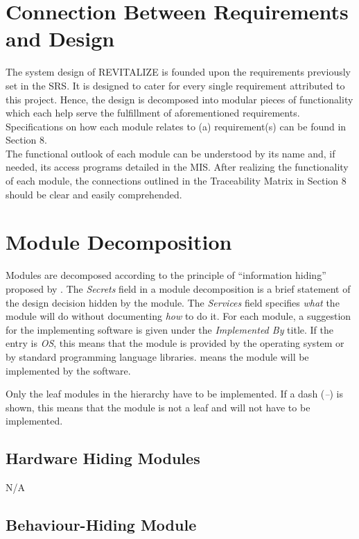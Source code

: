 \documentclass[12pt, titlepage]{article}
\begin{document}
\section{Connection Between Requirements and Design} \label{SecConnection}

The system design of REVITALIZE is founded upon the requirements previously set in the SRS. It is designed to cater for every single requirement attributed to this project. Hence, the design is decomposed into modular pieces of functionality which each help serve the fulfillment of aforementioned requirements. Specifications on how each module relates to (a) requirement(s) can be found in Section 8.\\
The functional outlook of each module can be understood by its name and, if needed, its access programs detailed in the MIS. After realizing the functionality of each module, the connections outlined in the Traceability Matrix in Section 8 should be clear and easily comprehended.
\section{Module Decomposition} \label{SecMD}

Modules are decomposed according to the principle of ``information hiding''
proposed by \citet{ParnasEtAl1984}. The \emph{Secrets} field in a module
decomposition is a brief statement of the design decision hidden by the
module. The \emph{Services} field specifies \emph{what} the module will do
without documenting \emph{how} to do it. For each module, a suggestion for the
implementing software is given under the \emph{Implemented By} title. If the
entry is \emph{OS}, this means that the module is provided by the operating
system or by standard programming language libraries.  \emph{\progname{}} means the
module will be implemented by the \progname{} software.

Only the leaf modules in the hierarchy have to be implemented. If a dash
(\emph{--}) is shown, this means that the module is not a leaf and will not have
to be implemented.

\subsection{Hardware Hiding Modules }
N/A

\subsection{Behaviour-Hiding Module}
\end{document}

